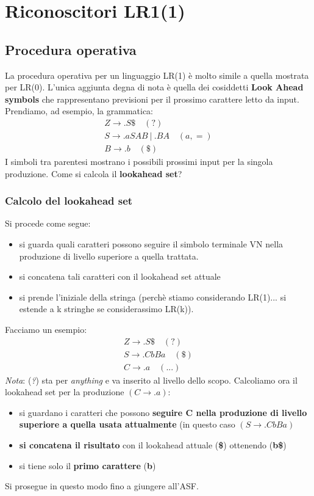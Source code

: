 \documentclass[a4paper, fleqn]{report}
\begin{document}
\chapter{Riconoscitori LR1(1)}
\section{Procedura operativa}
La procedura operativa per un linguaggio LR(1) è molto simile a quella mostrata per LR(0). L'unica aggiunta degna di nota è quella dei cosiddetti \textbf{Look Ahead symbols} che rappresentano previsioni per il prossimo carattere letto da input. 
Prendiamo, ad esempio, la grammatica:
\begin{gather*}
Z \rightarrow .S \$ \quad (?)\\
S \rightarrow .aSAB\ |\ .BA \quad (a,=)\\
B \rightarrow .b \quad (\$)
\end{gather*}
I simboli tra parentesi mostrano i possibili prossimi input per la singola produzione. Come si calcola il \textbf{lookahead set}?

\subsection{Calcolo del lookahead set}
Si procede come segue:
\begin{itemize}
\item si guarda quali caratteri possono seguire il simbolo terminale VN nella produzione di livello superiore a quella trattata.
\item si concatena tali caratteri con il lookahead set attuale
\item si prende l'iniziale della stringa (perchè stiamo considerando LR(1)... si estende a k stringhe se considerassimo LR(k)).
\end{itemize}
Facciamo un esempio:
\begin{gather*}
Z \rightarrow .S \$ \quad (?)\\
S \rightarrow .CbBa \quad (\$)\\
C \rightarrow .a \quad (...)
\end{gather*}
\emph{Nota}: (\emph{?}) sta per \emph{anything} e va inserito al livello dello scopo.
Calcoliamo ora il lookahead set per la produzione \((C \rightarrow .a)\):
\begin{itemize}
\item si guardano i caratteri che possono \textbf{seguire C nella produzione di livello superiore a quella usata attualmente} (in questo caso \((S \rightarrow .CbBa)\)
\item \textbf{si concatena il risultato} con il lookahead attuale (\textbf{\$}) ottenendo (\textbf{b\$})
\item si tiene solo il \textbf{primo carattere} (\textbf{b})
\end{itemize}
Si prosegue in questo modo fino a giungere all'ASF.
\end{document}
